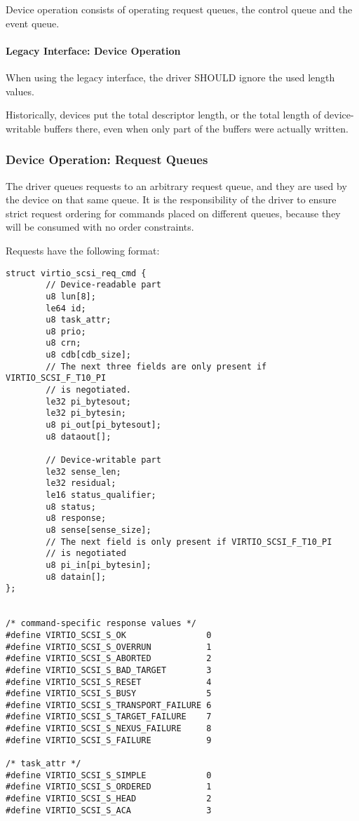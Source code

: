 Device operation consists of operating request queues, the control
queue and the event queue.

\paragraph{Legacy Interface: Device Operation}\label{sec:Device
Types / SCSI Host Device / Device Operation / Legacy
Interface: Device Operation}
When using the legacy interface, the driver SHOULD ignore the
used length values.
\begin{note}
Historically, devices put the total descriptor length,
or the total length of device-writable buffers there,
even when only part of the buffers were actually written.
\end{note}

\subsubsection{Device Operation: Request Queues}\label{sec:Device Types / SCSI Host Device / Device Operation / Device Operation: Request Queues}

The driver queues requests to an arbitrary request queue, and
they are used by the device on that same queue. It is the
responsibility of the driver to ensure strict request ordering
for commands placed on different queues, because they will be
consumed with no order constraints.

Requests have the following format:

\begin{lstlisting}
struct virtio_scsi_req_cmd {
        // Device-readable part
        u8 lun[8];
        le64 id;
        u8 task_attr;
        u8 prio;
        u8 crn;
        u8 cdb[cdb_size];
        // The next three fields are only present if VIRTIO_SCSI_F_T10_PI
        // is negotiated.
        le32 pi_bytesout;
        le32 pi_bytesin;
        u8 pi_out[pi_bytesout];
        u8 dataout[];

        // Device-writable part
        le32 sense_len;
        le32 residual;
        le16 status_qualifier;
        u8 status;
        u8 response;
        u8 sense[sense_size];
        // The next field is only present if VIRTIO_SCSI_F_T10_PI
        // is negotiated
        u8 pi_in[pi_bytesin];
        u8 datain[];
};


/* command-specific response values */
#define VIRTIO_SCSI_S_OK                0
#define VIRTIO_SCSI_S_OVERRUN           1
#define VIRTIO_SCSI_S_ABORTED           2
#define VIRTIO_SCSI_S_BAD_TARGET        3
#define VIRTIO_SCSI_S_RESET             4
#define VIRTIO_SCSI_S_BUSY              5
#define VIRTIO_SCSI_S_TRANSPORT_FAILURE 6
#define VIRTIO_SCSI_S_TARGET_FAILURE    7
#define VIRTIO_SCSI_S_NEXUS_FAILURE     8
#define VIRTIO_SCSI_S_FAILURE           9

/* task_attr */
#define VIRTIO_SCSI_S_SIMPLE            0
#define VIRTIO_SCSI_S_ORDERED           1
#define VIRTIO_SCSI_S_HEAD              2
#define VIRTIO_SCSI_S_ACA               3
\end{lstlisting}


